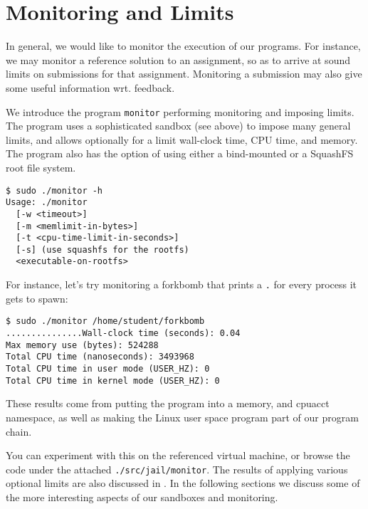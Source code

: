 
\section{Monitoring and Limits}

In general, we would like to monitor the execution of our programs. For
instance, we may monitor a reference solution to an assignment, so as to arrive
at sound limits on submissions for that assignment. Monitoring a submission may
also give some useful information wrt. feedback.

We introduce the program \texttt{monitor} performing monitoring and imposing
limits. The program uses a sophisticated sandbox (see above) to impose many
general limits, and allows optionally for a limit wall-clock time, CPU time,
and memory.  The program also has the option of using either a bind-mounted or
a SquashFS root file system.

\begin{lstlisting}
$ sudo ./monitor -h
Usage: ./monitor
  [-w <timeout>]
  [-m <memlimit-in-bytes>]
  [-t <cpu-time-limit-in-seconds>]
  [-s] (use squashfs for the rootfs)
  <executable-on-rootfs>
\end{lstlisting}

For instance, let's try monitoring a forkbomb that prints a \texttt{.} for
every process it gets to spawn:

\begin{lstlisting}
$ sudo ./monitor /home/student/forkbomb
...............Wall-clock time (seconds): 0.04
Max memory use (bytes): 524288
Total CPU time (nanoseconds): 3493968
Total CPU time in user mode (USER_HZ): 0
Total CPU time in kernel mode (USER_HZ): 0
\end{lstlisting}

These results come from putting the program into a memory, and cpuacct
namespace, as well as making the \cite{man-1-time} Linux user space program
part of our program chain.

You can experiment with this on the referenced virtual machine, or browse the
code under the attached \texttt{./src/jail/monitor}. The results of applying
various optional limits are also discussed in . In
the following sections we discuss some of the more interesting aspects of our
sandboxes and monitoring.
